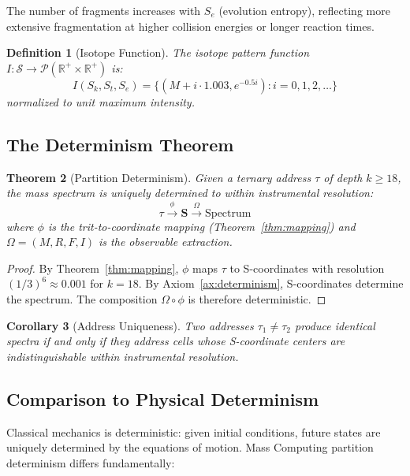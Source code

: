 \documentclass[twocolumn,10pt]{article}
\newtheorem{theorem}{Theorem}[section]
\newtheorem{definition}[theorem]{Definition}
\newtheorem{corollary}[theorem]{Corollary}
\begin{document}
The number of fragments increases with $S_e$ (evolution entropy), reflecting more extensive fragmentation at higher collision energies or longer reaction times.

\begin{definition}[Isotope Function]
The isotope pattern function $I: \mathcal{S} \to \mathcal{P}(\mathbb{R}^+ \times \mathbb{R}^+)$ is:
\begin{equation}
I(S_k, S_t, S_e) = \{(M + i \cdot 1.003, e^{-0.5i}) : i = 0, 1, 2, \ldots\}
\end{equation}
normalized to unit maximum intensity.
\end{definition}

\subsection{The Determinism Theorem}

\begin{theorem}[Partition Determinism]
\label{thm:determinism}
Given a ternary address $\tau$ of depth $k \geq 18$, the mass spectrum is uniquely determined to within instrumental resolution:
\begin{equation}
\tau \xrightarrow{\phi} \mathbf{S} \xrightarrow{\Omega} \text{Spectrum}
\end{equation}
where $\phi$ is the trit-to-coordinate mapping (Theorem~\ref{thm:mapping}) and $\Omega = (M, R, F, I)$ is the observable extraction.
\end{theorem}

\begin{proof}
By Theorem~\ref{thm:mapping}, $\phi$ maps $\tau$ to S-coordinates with resolution $(1/3)^6 \approx 0.001$ for $k = 18$. By Axiom~\ref{ax:determinism}, S-coordinates determine the spectrum. The composition $\Omega \circ \phi$ is therefore deterministic.
\end{proof}

\begin{corollary}[Address Uniqueness]
Two addresses $\tau_1 \neq \tau_2$ produce identical spectra if and only if they address cells whose S-coordinate centers are indistinguishable within instrumental resolution.
\end{corollary}

\subsection{Comparison to Physical Determinism}

Classical mechanics is deterministic: given initial conditions, future states are uniquely determined by the equations of motion. Mass Computing partition determinism differs fundamentally:
\end{document}
